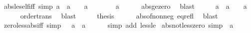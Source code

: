 \begin{isabellebody}
\isadelimproof
\isanewline
%
\endisadelimproof
\isanewline
{}\isamarkupfalse%
\ abs{\isacharunderscore}{\kern0pt}le{\isacharunderscore}{\kern0pt}self{\isacharunderscore}{\kern0pt}iff\ {\isacharbrackleft}{\kern0pt}simp{\isacharbrackright}{\kern0pt}{\isacharcolon}{\kern0pt}\ {\isachardoublequoteopen}{\isasymbar}a{\isasymbar}\ {\isasymle}\ a\ {\isasymlongleftrightarrow}\ {}\ {\isasymle}\ a{\isachardoublequoteclose}\isanewline
%
\isadelimproof
%
\endisadelimproof
%
\isatagproof
{}\isamarkupfalse%
\ {\isacharminus}{\kern0pt}\isanewline
\ \ \isamarkupfalse%
\ {\isachardoublequoteopen}{}\ {\isasymle}\ {\isasymbar}a{\isasymbar}{\isachardoublequoteclose}\isanewline
\ \ \ \ \isamarkupfalse%
\ abs{\isacharunderscore}{\kern0pt}ge{\isacharunderscore}{\kern0pt}zero\ \isamarkupfalse%
\ blast\isanewline
\ \ \isamarkupfalse%
\ \isamarkupfalse%
\ {\isachardoublequoteopen}{\isasymbar}a{\isasymbar}\ {\isasymle}\ a\ {\isasymLongrightarrow}\ {}\ {\isasymle}\ a{\isachardoublequoteclose}\isanewline
\ \ \ \ \isamarkupfalse%
\ order{\isachardot}{\kern0pt}trans\ \isamarkupfalse%
\ blast\isanewline
\ \ \isamarkupfalse%
\ \isamarkupfalse%
\ {\isacharquery}{\kern0pt}thesis\isanewline
\ \ \ \ \isamarkupfalse%
\ abs{\isacharunderscore}{\kern0pt}of{\isacharunderscore}{\kern0pt}nonneg\ eq{\isacharunderscore}{\kern0pt}refl\ \isamarkupfalse%
\ blast\isanewline
{}\isamarkupfalse%
%
\endisatagproof
{\isafoldproof}%
%
\isadelimproof
\isanewline
%
\endisadelimproof
\isanewline
{}\isamarkupfalse%
\ zero{\isacharunderscore}{\kern0pt}less{\isacharunderscore}{\kern0pt}abs{\isacharunderscore}{\kern0pt}iff\ {\isacharbrackleft}{\kern0pt}simp{\isacharbrackright}{\kern0pt}{\isacharcolon}{\kern0pt}\ {\isachardoublequoteopen}{}\ {\isacharless}{\kern0pt}\ {\isasymbar}a{\isasymbar}\ {\isasymlongleftrightarrow}\ a\ {\isasymnoteq}\ {}{\isachardoublequoteclose}\isanewline
%
\isadelimproof
\ \ %
\endisadelimproof
%
\isatagproof
{}\isamarkupfalse%
\ {\isacharparenleft}{\kern0pt}simp\ add{\isacharcolon}{\kern0pt}\ less{\isacharunderscore}{\kern0pt}le{\isacharparenright}{\kern0pt}%
\endisatagproof
{\isafoldproof}%
%
\isadelimproof
\isanewline
%
\endisadelimproof
\isanewline
{}\isamarkupfalse%
\ abs{\isacharunderscore}{\kern0pt}not{\isacharunderscore}{\kern0pt}less{\isacharunderscore}{\kern0pt}zero\ {\isacharbrackleft}{\kern0pt}simp{\isacharbrackright}{\kern0pt}{\isacharcolon}{\kern0pt}\ {\isachardoublequoteopen}{\isasymnot}\ {\isasymbar}a{\isasymbar}\ {\isacharless}{\kern0pt}\ {}{\isachardoublequoteclose}\isanewline

\end{isabellebody}
